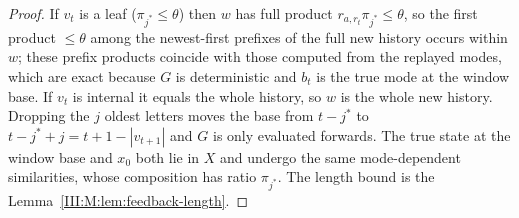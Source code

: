 \begin{proof}
If $v_t$ is a leaf ($\pi_{j^\ast}\le\theta$) then $w$ has full product
$r_{a,r_t}\pi_{j^\ast}\le\theta$, so the first product $\le\theta$ among the newest-first
prefixes of the full new history occurs within $w$; these prefix products coincide with
those computed from the replayed modes, which are exact because $G$ is deterministic and
$b_t$ is the true mode at the window base. If $v_t$ is internal it equals the whole history,
so $w$ is the whole new history. Dropping the $j$ oldest letters moves the base from
$t-j^\ast$ to $t-j^\ast+j=t+1-|v_{t+1}|$ and $G$ is only evaluated forwards. The true state
at the window base and $x_0$ both lie in $X$ and undergo the same mode-dependent
similarities, whose composition has ratio $\pi_{j^\ast}$. The length bound is the
Lemma~\ref{III:M:lem:feedback-length}.
\end{proof}
